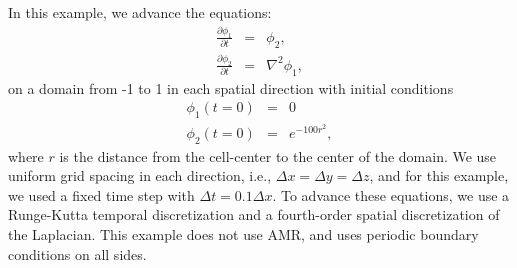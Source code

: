 In this example, we advance the equations:
\begin{eqnarray}
\frac{\partial\phi_1}{\partial t} &=& \phi_2, \\
\frac{\partial\phi_2}{\partial t} &=& \nabla^2\phi_1,
\end{eqnarray}
on a domain from -1 to 1 in each spatial direction with initial conditions
\begin{eqnarray}
\phi_1(t=0) &=& 0 \\
\phi_2(t=0) &=& e^{-100r^2},
\end{eqnarray}
where $r$ is the distance from the cell-center to the center of the domain.
We use uniform grid spacing in each direction, i.e., $\Delta x = \Delta y = \Delta z$,
and for this example, we used a fixed time step with $\Delta t = 0.1\Delta x$.
To advance these equations, we use a Runge-Kutta temporal discretization and a 
fourth-order spatial discretization of the Laplacian.  This example does not use AMR, 
and uses periodic boundary conditions on all sides.


